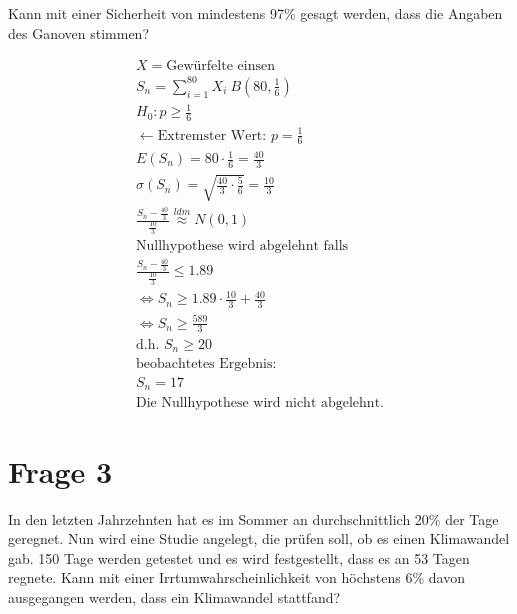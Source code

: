 Kann mit einer Sicherheit von mindestens 97\% gesagt werden, dass die Angaben des Ganoven stimmen?

\begin{align*}
    X = \text{Gewürfelte einsen} \\
    S_n = \sum_{i = 1}^{80} X_i ~ B\left(80, \frac{1}{6}\right) \\
    H_0: p \geq \frac{1}{6} \\
    \leftarrow \text{Extremster Wert: } p = \frac{1}{6} \\
    E(S_n) = 80 \cdot \frac{1}{6} = \frac{40}{3} \\
    \sigma (S_n) = \sqrt{\frac{40}{3} \cdot \frac{5}{6}} = \frac{10}{3} \\
    \frac{S_n - \frac{40}{3}}{\frac{10}{3}} \overset{ldm}{\approx} N(0, 1) \\
    \text{Nullhypothese wird abgelehnt falls} \\
    \frac{S_n - \frac{40}{3}}{\frac{10}{3}} \leq 1.89 \\
    \Leftrightarrow S_n \geq 1.89 \cdot \frac{10}{3} + \frac{40}{3} \\
    \Leftrightarrow S_n \geq \frac{589}{3} \\
    \text{d.h. } S_n \geq 20 \\
    \text{beobachtetes Ergebnis: } \\
    S_n = 17 \\
    \text{Die Nullhypothese wird nicht abgelehnt.}
\end{align*}

\section{Frage 3} 
In den letzten Jahrzehnten hat es im Sommer an durchschnittlich 20\% der Tage geregnet. Nun wird eine Studie angelegt, die prüfen soll, ob es einen Klimawandel gab. 150 Tage werden getestet und es wird festgestellt, dass es an 53 Tagen regnete. Kann mit einer Irrtumwahrscheinlichkeit von höchstens 6\% davon ausgegangen werden, dass ein Klimawandel stattfand?


